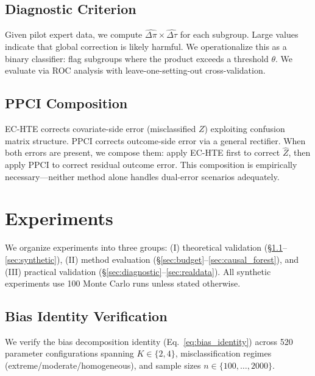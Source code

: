 \documentclass[11pt,twocolumn]{article}
\begin{document}
\subsection{Diagnostic Criterion}

Given pilot expert data, we compute $\widehat{\Delta\pi} \times \widehat{\Delta\tau}$ for each subgroup. Large values indicate that global correction is likely harmful. We operationalize this as a binary classifier: flag subgroups where the product exceeds a threshold $\theta$. We evaluate via ROC analysis with leave-one-setting-out cross-validation.

\subsection{PPCI Composition}

EC-HTE corrects covariate-side error (misclassified $Z$) exploiting confusion matrix structure. PPCI \citep{sui2026prediction} corrects outcome-side error via a general rectifier. When both errors are present, we compose them: apply EC-HTE first to correct $\hat{Z}$, then apply PPCI to correct residual outcome error. This composition is empirically necessary---neither method alone handles dual-error scenarios adequately.

\section{Experiments}

We organize experiments into three groups: (I) theoretical validation (\S\ref{sec:identity}--\ref{sec:synthetic}), (II) method evaluation (\S\ref{sec:budget}--\ref{sec:causal_forest}), and (III) practical validation (\S\ref{sec:diagnostic}--\ref{sec:realdata}). All synthetic experiments use 100 Monte Carlo runs unless stated otherwise.

\subsection{Bias Identity Verification}
\label{sec:identity}

We verify the bias decomposition identity (Eq.~\ref{eq:bias_identity}) across 520 parameter configurations spanning $K \in \{2, 4\}$, misclassification regimes (extreme/moderate/homogeneous), and sample sizes $n \in \{100, \ldots, 2000\}$.
\end{document}
